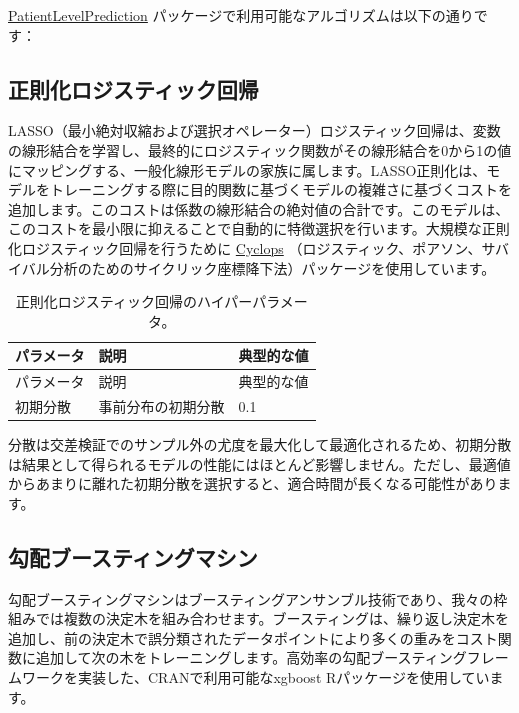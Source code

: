 \documentclass[
  11pt]{book}
\theoremstyle{definition}
\theoremstyle{definition}
\theoremstyle{definition}
\theoremstyle{definition}
\theoremstyle{remark}
\begin{document}
\href{https://ohdsi.github.io/PatientLevelPrediction/}{PatientLevelPrediction} パッケージで利用可能なアルゴリズムは以下の通りです：

\subsection{正則化ロジスティック回帰}\label{ux6b63ux5247ux5316ux30edux30b8ux30b9ux30c6ux30a3ux30c3ux30afux56deux5e30}

LASSO（最小絶対収縮および選択オペレーター）ロジスティック回帰は、変数の線形結合を学習し、最終的にロジスティック関数がその線形結合を0から1の値にマッピングする、一般化線形モデルの家族に属します。LASSO正則化は、モデルをトレーニングする際に目的関数に基づくモデルの複雑さに基づくコストを追加します。このコストは係数の線形結合の絶対値の合計です。このモデルは、このコストを最小限に抑えることで自動的に特徴選択を行います。大規模な正則化ロジスティック回帰を行うために \href{https://ohdsi.github.io/Cyclops/}{Cyclops} （ロジスティック、ポアソン、サバイバル分析のためのサイクリック座標降下法）パッケージを使用しています。    

\begin{longtable}[]{@{}lll@{}}
\caption{\label{tab:lassoParameters} 正則化ロジスティック回帰のハイパーパラメータ。}\tabularnewline
\toprule\noalign{}
パラメータ & 説明 & 典型的な値 \\
\midrule\noalign{}
\endfirsthead
\toprule\noalign{}
パラメータ & 説明 & 典型的な値 \\
\midrule\noalign{}
\endhead
\bottomrule\noalign{}
\endlastfoot
初期分散 & 事前分布の初期分散 & 0.1 \\
\end{longtable}

分散は交差検証でのサンプル外の尤度を最大化して最適化されるため、初期分散は結果として得られるモデルの性能にはほとんど影響しません。ただし、最適値からあまりに離れた初期分散を選択すると、適合時間が長くなる可能性があります。  

\subsection{勾配ブースティングマシン}\label{ux52feux914dux30d6ux30fcux30b9ux30c6ux30a3ux30f3ux30b0ux30deux30b7ux30f3}

勾配ブースティングマシンはブースティングアンサンブル技術であり、我々の枠組みでは複数の決定木を組み合わせます。ブースティングは、繰り返し決定木を追加し、前の決定木で誤分類されたデータポイントにより多くの重みをコスト関数に追加して次の木をトレーニングします。高効率の勾配ブースティングフレームワークを実装した、CRANで利用可能なxgboost Rパッケージを使用しています。  
\end{document}
